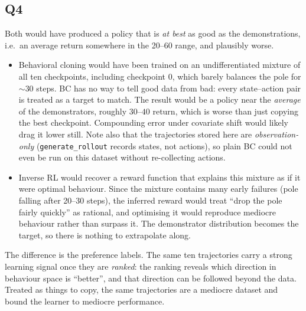 \documentclass[11pt]{article}
\begin{document}
\subsection*{Q4}

Both would have produced a policy that is \emph{at best} as good as the demonstrations, i.e.\ an
average return somewhere in the 20--60 range, and plausibly worse.

\begin{itemize}
  \item Behavioral cloning would have been trained on an undifferentiated mixture of all
  ten checkpoints, including checkpoint 0, which barely balances the pole for $\sim 30$ steps.
  BC has no way to tell good data from bad: every state--action pair is treated as a target to
  match. The result would be a policy near the \emph{average} of the demonstrators, roughly
  $30$--$40$ return, which is worse than just copying the best checkpoint. Compounding error
  under covariate shift would likely drag it lower still. Note also that the trajectories stored
  here are \emph{observation-only} (\texttt{generate\_rollout} records states, not actions), so
  plain BC could not even be run on this dataset without re-collecting actions.
  \item Inverse RL would recover a reward function that explains this mixture as if it
  were optimal behaviour. Since the mixture contains many early failures (pole falling after
  20--30 steps), the inferred reward would treat ``drop the pole fairly quickly'' as rational,
  and optimising it would reproduce mediocre behaviour rather than surpass it. The demonstrator
  distribution becomes the target, so there is nothing to extrapolate along.
\end{itemize}

The difference is the preference labels. The same ten trajectories carry a strong learning
signal once they are \emph{ranked}: the ranking reveals which direction in behaviour space is
``better'', and that direction can be followed beyond the data. Treated as things to copy, the
same trajectories are a mediocre dataset and bound the learner to mediocre performance.
\end{document}
